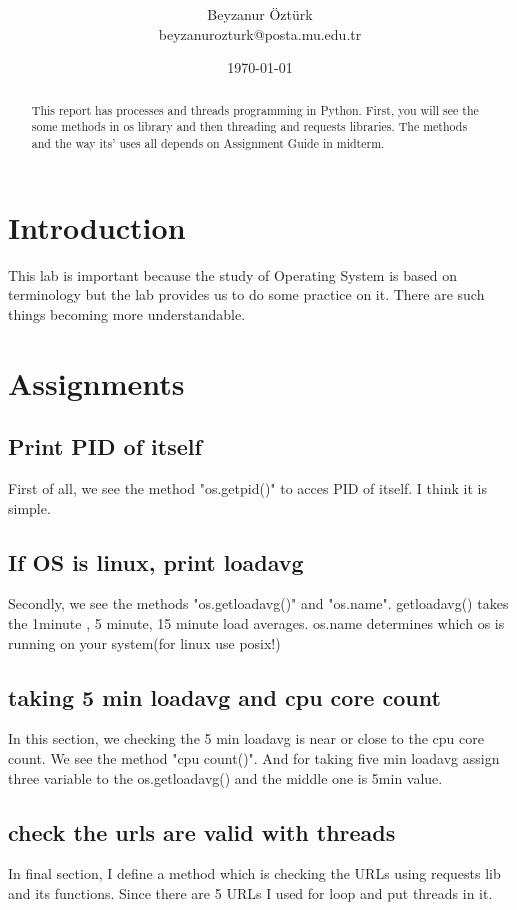 \documentclass[onecolumn]{article}
\title{\spacecaps{Assignment Report 1: Process and Thread Implementation}\\ \normalsize \spacesc{CENG2034, Operating Systems} }
\author{Beyzanur Öztürk\\beyzanurozturk@posta.mu.edu.tr}
\date{\today}
\begin{document}
\maketitle

\begin{abstract}
This report has processes and threads programming in Python. First, you will see the some methods in os library and then threading and requests libraries. The methods and the way its' uses all depends on Assignment Guide in midterm. 
\end{abstract}


\section{Introduction}
This lab is important because the study of Operating System is based on terminology but the lab provides us to do some practice on it. There are such things becoming more understandable.

\section{Assignments}

\subsection{Print PID of itself}
First of all, we see the method "os.getpid()" to acces PID of itself. I think it is simple.

\subsection{If OS is linux, print loadavg}
Secondly, we see the methods "os.getloadavg()" and "os.name".
getloadavg() takes the 1minute , 5 minute, 15 minute load averages.
os.name determines which os is running on your system(for linux use posix!)

\subsection{taking 5 min loadavg and cpu core count}
In this section, we checking the 5 min loadavg is near or close to the cpu core count. We see the method "cpu count()". And for taking five min loadavg assign three variable to the os.getloadavg() and the middle one is 5min value.
\subsection{check the urls are valid with threads}
In final section, I define a method which is checking the URLs using requests lib and its functions. Since there are 5 URLs I used for loop and put threads in it.
\end{document}
